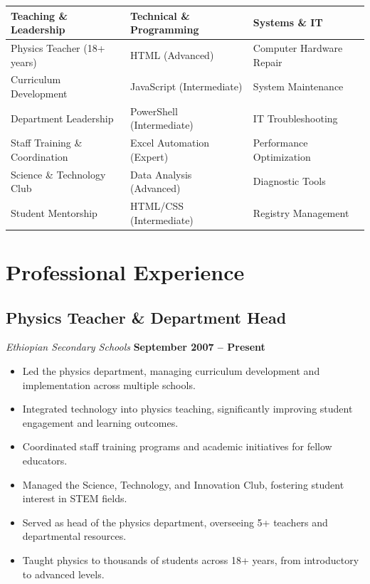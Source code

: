 \documentclass[11pt]{article}
\begin{document}
\begin{tabular}{p{} p{} p{}}
    \textbf{Teaching \& Leadership} & \textbf{Technical \& Programming} & \textbf{Systems \& IT} \\
    \midrule
    Physics Teacher (18+ years) & HTML (Advanced) & Computer Hardware Repair \\
    Curriculum Development & JavaScript (Intermediate) & System Maintenance \\
    Department Leadership & PowerShell (Intermediate) & IT Troubleshooting \\
    Staff Training \& Coordination & Excel Automation (Expert) & Performance Optimization \\
    Science \& Technology Club & Data Analysis (Advanced) & Diagnostic Tools \\
    Student Mentorship & HTML/CSS (Intermediate) & Registry Management \\
\end{tabular}

\section{Professional Experience}

\subsection{Physics Teacher \& Department Head}
\textit{Ethiopian Secondary Schools} \hfill \textbf{September 2007 -- Present}

\begin{itemize}[leftmargin=1.5em, itemsep=0.3em]
    \item Led the physics department, managing curriculum development and implementation across multiple schools.
    \item Integrated technology into physics teaching, significantly improving student engagement and learning outcomes.
    \item Coordinated staff training programs and academic initiatives for fellow educators.
    \item Managed the Science, Technology, and Innovation Club, fostering student interest in STEM fields.
    \item Served as head of the physics department, overseeing 5+ teachers and departmental resources.
    \item Taught physics to thousands of students across 18+ years, from introductory to advanced levels.
\end{itemize}
\end{document}
